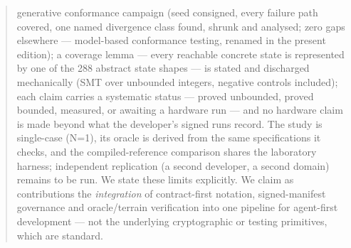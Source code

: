 \documentclass[11pt,a4paper]{article}
\begin{document}
\begin{abstract}
generative conformance campaign (seed consigned, every failure path
covered, one named divergence class found, shrunk and analysed; zero gaps
elsewhere --- model-based conformance testing, renamed in the present
edition); a coverage lemma --- every reachable concrete state is
represented by one of the 288 abstract state shapes --- is stated and
discharged mechanically (SMT over unbounded integers, negative controls
included); each claim carries a systematic status --- proved unbounded,
proved bounded, measured, or awaiting a hardware run --- and no hardware
claim is made beyond what the developer's signed runs record. The study is
single-case (N=1), its oracle is derived from the same specifications it
checks, and the compiled-reference comparison shares the laboratory
harness; independent replication (a second developer, a second domain)
remains to be run. We state these limits explicitly. We claim as contributions the \emph{integration}
of contract-first notation, signed-manifest governance and oracle/terrain
verification into one pipeline for agent-first development --- not the
underlying cryptographic or testing primitives, which are standard.
\end{abstract}
\end{document}
